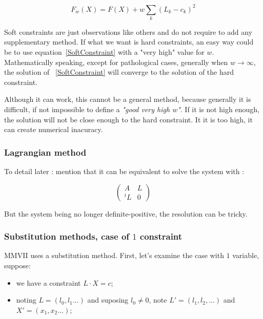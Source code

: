 \begin{equation}
    F_w(X) = F(X) + w  \sum_k (L_k-c_k)^2 \label{SoftConstraint}
\end{equation}

Soft constraints are just observations like others and do not require
to add any supplementary method. If what we want is hard constraints, an
easy way could be to use equation~\ref{SoftConstraint} with a "very high"
value for $w$.   Mathematically speaking, except for pathological cases,
generally when $w \rightarrow \infty$, the solution of ~\ref{SoftConstraint}
will converge to the solution of the hard constraint.

Although it can work, this cannot be a general method, because generally
it is difficult, if not impossible to define a \emph{"good very high $w$"}.
If it is not high enough, the solution will not be close enough to the hard
constraint.  It it is too high, it can create numerical inacuracy.


\subsubsection{Lagrangian method}

To detail later : mention that it can be equivalent to solve the system with :

\begin{equation}
  \begin{pmatrix}
   A & L \\
   ^t L & 0 
  \end{pmatrix}
\end{equation}

But the system being no longer definite-positive, the resolution can be tricky.


\subsubsection{Substitution methods, case of $1$ constraint}
\label{CSTR:SUBST}

MMVII uses a substitution method. First, let's examine the case with $1$ variable, suppose:

\begin{itemize}
    \item we have a constraint $L \cdot X = c$;
    \item noting $L= (l_0,l_1 \dots)$ and suposing $l_0 \neq 0$,  note $L'=(l_1,l_2, \dots)$ and $X'=(x_1,x_2\dots)$;
\end{itemize}


